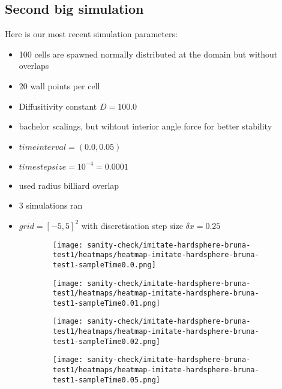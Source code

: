 \newpage
\subsection*{Second big simulation}
Here is our most recent simulation parameters:
\begin{itemize}
    \item 100 cells are spawned normally distributed at the domain but without overlaps  
    \item 20 wall points per cell 
    \item Diffusitivity constant $D=100.0$
    \item bachelor scalings, but wihtout interior angle force for better stability
    \item $time interval = (0.0, 0.05)$
    \item $time step size = 10^{-4} = 0.0001$
    \item used radius billiard overlap 
    \item 3 simulations ran 
    \item $grid = [-5,5]^2$ with discretisation step size $\delta x = 0.25$
\end{itemize}

\begin{figure}[h!]
	\centering
	\begin{subfigure}{0.4\textwidth}
		\texttt{[image: sanity-check/imitate-hardsphere-bruna-test1/heatmaps/heatmap-imitate-hardsphere-bruna-test1-sampleTime0.0.png]}
	\end{subfigure}
	\hfill
	\begin{subfigure}{0.4\textwidth}
		\texttt{[image: sanity-check/imitate-hardsphere-bruna-test1/heatmaps/heatmap-imitate-hardsphere-bruna-test1-sampleTime0.01.png]}
	\end{subfigure}
	\hfill
	\begin{subfigure}{0.4\textwidth}
		\texttt{[image: sanity-check/imitate-hardsphere-bruna-test1/heatmaps/heatmap-imitate-hardsphere-bruna-test1-sampleTime0.02.png]}
	\end{subfigure}\hfill
	\begin{subfigure}{0.4\textwidth}
		\texttt{[image: sanity-check/imitate-hardsphere-bruna-test1/heatmaps/heatmap-imitate-hardsphere-bruna-test1-sampleTime0.05.png]}
	\end{subfigure}
	\label{fig:model_illus}
\end{figure}

